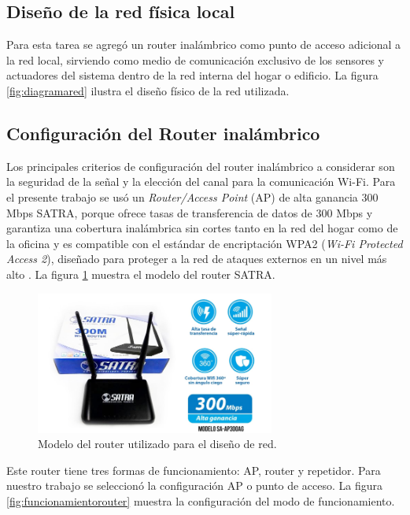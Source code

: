 \subsection{Diseño de la red física local}

Para esta tarea se agregó un router inalámbrico como punto de acceso adicional a la red local, sirviendo como medio de comunicación exclusivo de los sensores y actuadores del sistema dentro de la red interna del hogar o edificio. La figura \ref{fig:diagramared} ilustra el diseño físico de la red utilizada.


\subsection{Configuración del Router inalámbrico}
Los principales criterios de configuración del router inalámbrico a considerar son la seguridad de la señal y la elección del canal para la comunicación Wi-Fi. Para el presente trabajo se usó un \emph{Router/Access Point} (AP) de alta ganancia 300 Mbps SATRA, porque ofrece tasas de transferencia de datos de 300 Mbps y garantiza una cobertura inalámbrica sin cortes tanto en la red del hogar como de la oficina y es compatible con el estándar de encriptación WPA2 (\emph{Wi-Fi Protected Access 2}), diseñado para proteger a la red de ataques externos en un nivel más alto \citep{WEBSITE:25}. La figura \ref{fig:router} muestra el modelo del router SATRA.

\begin{figure}[htpb]
\centering 
\includegraphics[width=0.7\textwidth]{./Figures/router.jpg}
\caption{Modelo del router utilizado para el diseño de red.}
\label{fig:router}
\end{figure}

Este router tiene tres formas de funcionamiento: AP, router y repetidor. Para nuestro trabajo se seleccionó la configuración AP o punto de acceso. La figura \ref{fig:funcionamientorouter} muestra la configuración del modo de funcionamiento.


